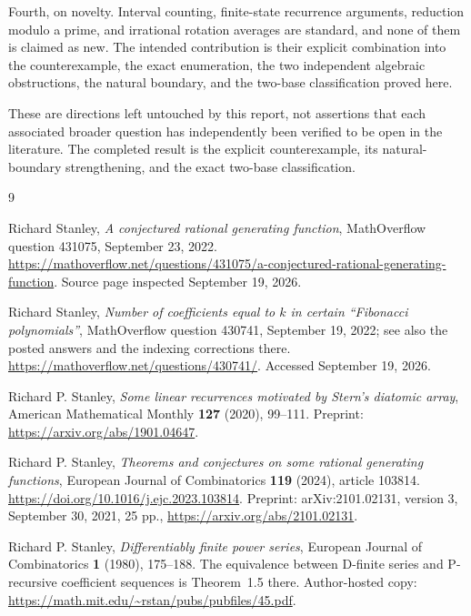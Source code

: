 \documentclass[11pt,letterpaper]{article}
\numberwithin{equation}{section}
\theoremstyle{definition}
\theoremstyle{remark}
\begin{document}
Fourth, on novelty. Interval counting, finite-state recurrence arguments,
reduction modulo a prime, and irrational rotation averages are standard,
and none of them is claimed as new. The intended contribution is their
explicit combination into the counterexample, the exact enumeration, the
two independent algebraic obstructions, the natural boundary, and the
two-base classification proved here.

These are directions left untouched by this report, not assertions that
each associated broader question has independently been verified to be
open in the literature. The completed result is the explicit counterexample,
its natural-boundary strengthening, and the exact two-base classification.

\begin{thebibliography}{9}
\raggedright

Richard Stanley,
\emph{A conjectured rational generating function},
MathOverflow question 431075, September 23, 2022.
\url{https://mathoverflow.net/questions/431075/a-conjectured-rational-generating-function}.
Source page inspected September 19, 2026.

Richard Stanley,
\emph{Number of coefficients equal to $k$ in certain ``Fibonacci
polynomials''},
MathOverflow question 430741, September 19, 2022; see also the posted
answers and the indexing corrections there.
\url{https://mathoverflow.net/questions/430741/}.
Accessed September 19, 2026.

Richard P. Stanley,
\emph{Some linear recurrences motivated by Stern's diatomic array},
American Mathematical Monthly \textbf{127} (2020), 99--111.
Preprint: \url{https://arxiv.org/abs/1901.04647}.

Richard P. Stanley,
\emph{Theorems and conjectures on some rational generating functions},
European Journal of Combinatorics \textbf{119} (2024), article 103814.
\url{https://doi.org/10.1016/j.ejc.2023.103814}.
Preprint: arXiv:2101.02131, version 3, September 30, 2021, 25 pp.,
\url{https://arxiv.org/abs/2101.02131}.

Richard P. Stanley,
\emph{Differentiably finite power series},
European Journal of Combinatorics \textbf{1} (1980), 175--188.
The equivalence between D-finite series and P-recursive coefficient
sequences is Theorem~1.5 there. Author-hosted copy:
\url{https://math.mit.edu/~rstan/pubs/pubfiles/45.pdf}.

\end{thebibliography}
\end{document}
